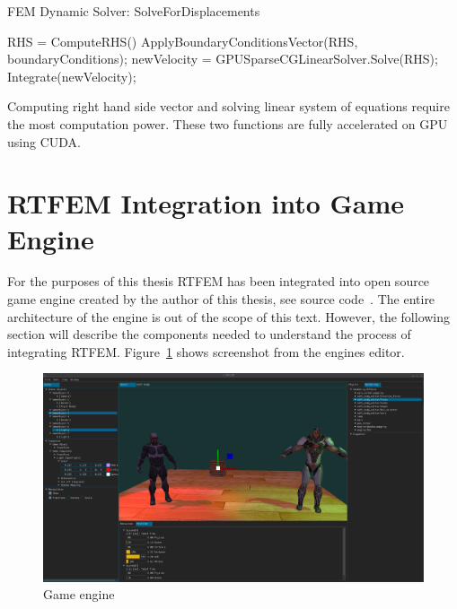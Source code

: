 \documentclass[en]{minipw} %
\begin{document}
\begin{algorithm}
\caption{FEM Dynamic Solver: SolveForDisplacements}
\label{alg:SolveForDisplacements}
\begin{algorithmic}[1]
\State RHS = ComputeRHS()
\State ApplyBoundaryConditionsVector(RHS, boundaryConditions);
\State newVelocity = GPUSparseCGLinearSolver.Solve(RHS);
\State Integrate(newVelocity);
\EndProcedure
\end{algorithmic}
\end{algorithm}

Computing right hand side vector and solving linear system of equations require the most computation power. These two functions are fully accelerated on GPU using CUDA.

\section{RTFEM Integration into Game Engine}
For the purposes of this thesis RTFEM has been integrated into open source game engine created by the author of this thesis, see source code~\cite{ifx}. The entire architecture of the engine is out of the scope of this text. However, the following section will describe the components needed to understand the process of integrating RTFEM. Figure~\ref{fig:ifx_example} shows screenshot from the engines editor.

\begin{figure}[h!]
\centering
\includegraphics[scale=0.2]{pictures/ifx/ifx.png}
\caption[Game engine]{Game engine~\cite{ifx}}
\label{fig:ifx_example}
\end{figure}
\end{document}
